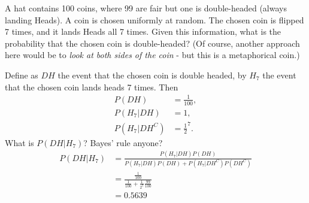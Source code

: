 

\setcounter{theorem}{3}

\begin{exercise}[BH.2.6]
A hat contains 100 coins, where 99 are fair but one is double-headed (always landing Heads). A coin is chosen uniformly at random. The chosen coin is flipped 7 times, and it lands Heads all 7 times. Given this information, what is the probability that the chosen coin is double-headed? (Of course, another approach here would be to \emph{look at both sides of the coin} - but this is a metaphorical coin.)
\begin{solution}
	Define as $DH$ the event that the chosen coin is double headed, by $H_{7}$ the event that the chosen coin lands heads 7 times. Then
	\begin{align*}
		P(DH) &= \frac{1}{100},\\
		P(H_{7}|DH) & = 1,\\
		P(H_{7}|DH^{C}) & = \frac{1}{2}^7.
	\end{align*}
	What is $P(DH|H_{7})$? Bayes' rule anyone?
	\begin{align*}
		P(DH|H_{7}) &= \frac{P(H_{7}|DH)P(DH)}{P(H_{7}|DH)P(DH) + P(H_{7}|DH^{C})P(DH^{C})}\\
		& = \frac{\frac{1}{100}}{\frac{1}{100} + \frac{1}{2^7}\frac{99}{100}}\\
		& = 0.5639
	\end{align*}
\end{solution}
\end{exercise}


